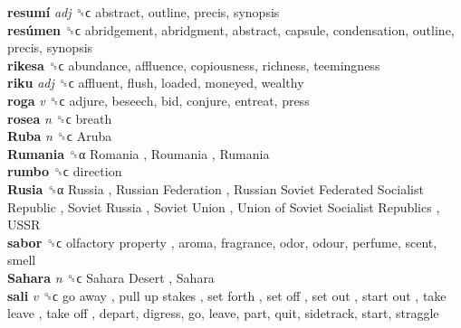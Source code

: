 \textbf{resumí} \emph{adj}  ␝ϲ  abstract, outline, precis, synopsis  \\
\textbf{resúmen} ␝ϲ  abridgement, abridgment, abstract, capsule, condensation, outline, precis, synopsis  \\
\textbf{rikesa} ␝ϲ  abundance, affluence, copiousness, richness, teemingness  \\
\textbf{riku} \emph{adj}  ␝ϲ  affluent, flush, loaded, moneyed, wealthy  \\
\textbf{roga} \emph{v}  ␝ϲ  adjure, beseech, bid, conjure, entreat, press  \\
\textbf{rosea} \emph{n}  ␝ϲ  breath  \\
\textbf{Ruba} \emph{n}  ␝ϲ   Aruba   \\
\textbf{Rumania} ␝α   Romania ,  Roumania ,  Rumania   \\
\textbf{rumbo} ␝ϲ  direction  \\
\textbf{Rusia} ␝α   Russia ,  Russian Federation ,  Russian Soviet Federated Socialist Republic ,  Soviet Russia ,  Soviet Union ,  Union of Soviet Socialist Republics ,  USSR   \\
\textbf{sabor} ␝ϲ   olfactory property , aroma, fragrance, odor, odour, perfume, scent, smell  \\
\textbf{Sahara} \emph{n}  ␝ϲ   Sahara Desert ,  Sahara   \\
\textbf{sali} \emph{v}  ␝ϲ   go away ,  pull up stakes ,  set forth ,  set off ,  set out ,  start out ,  take leave ,  take off , depart, digress, go, leave, part, quit, sidetrack, start, straggle  \\
